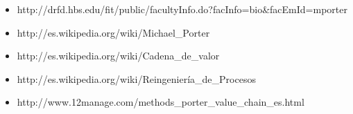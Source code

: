 \begin{itemize}
	\item http://drfd.hbs.edu/fit/public/facultyInfo.do?facInfo=bio\&facEmId=mporter
	\item http://es.wikipedia.org/wiki/Michael\_Porter
	\item http://es.wikipedia.org/wiki/Cadena\_de\_valor
	\item http://es.wikipedia.org/wiki/Reingeniería\_de\_Procesos
	\item http://www.12manage.com/methods\_porter\_value\_chain\_es.html
\end{itemize}
\newpage

